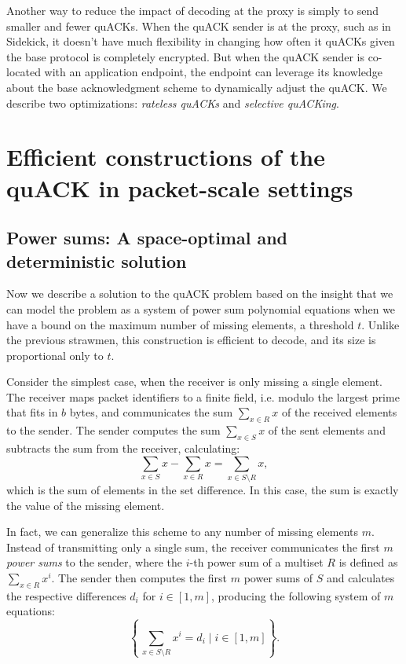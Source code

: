 Another way to reduce the impact of decoding at the proxy is simply to send smaller
and fewer quACKs. When the quACK sender is at the proxy, such as in Sidekick,
it doesn't have much flexibility in changing how often it quACKs given
the base protocol is completely encrypted. But when the quACK sender is co-located
with an application endpoint, the endpoint can leverage its knowledge about the
base acknowledgment scheme to dynamically adjust the quACK.
We describe two optimizations: \textit{rateless quACKs} and \textit{selective quACKing}.


\section{Efficient constructions of the quACK in packet-scale settings}
\label{sec:quack:constructions}



\subsection{Power sums: A space-optimal and deterministic solution}
\label{sec:quack:constructions:power-sum}

Now we describe a solution to the quACK problem based on the insight
that we can model the problem as a system of power sum polynomial equations
when we have a bound on the maximum number of missing elements, a threshold $t$.
Unlike the previous strawmen, this construction is efficient to decode, and
its size is proportional only to $t$.

Consider the simplest case, when the receiver is only missing a single element.
The receiver maps packet identifiers to a finite field,
i.e. modulo the largest prime that fits in $b$ bytes,
 and communicates the sum $\sum_{x \in R} x$ of the received
elements to
the sender. The sender computes the sum $\sum_{x \in S} x$ of the sent elements
and subtracts the sum from the receiver, calculating:
\[
    \sum_{x \in S} x - \sum_{x \in R} x = \sum_{x \in S\setminus R} x,
\]
which is the sum of elements in the set difference. In this case, the sum is
exactly the value of the missing element.

In fact, we can generalize this scheme to any number of missing elements $m$.
Instead of transmitting only a single sum, the receiver communicates
the first $m$ \emph{power sums} to the sender, where the $i$-th power sum of a
multiset $R$ is defined as $\sum_{x \in R} x^i$.
The sender then computes the first $m$ power sums of $S$ and calculates the
respective differences $d_i$ for $i \in [1,m]$, producing the following
system of $m$ equations:
\[
    \left\{\, \sum_{x \in S\setminus R} x^i = d_i \mid i \in [1,m] \right\}.
\]

